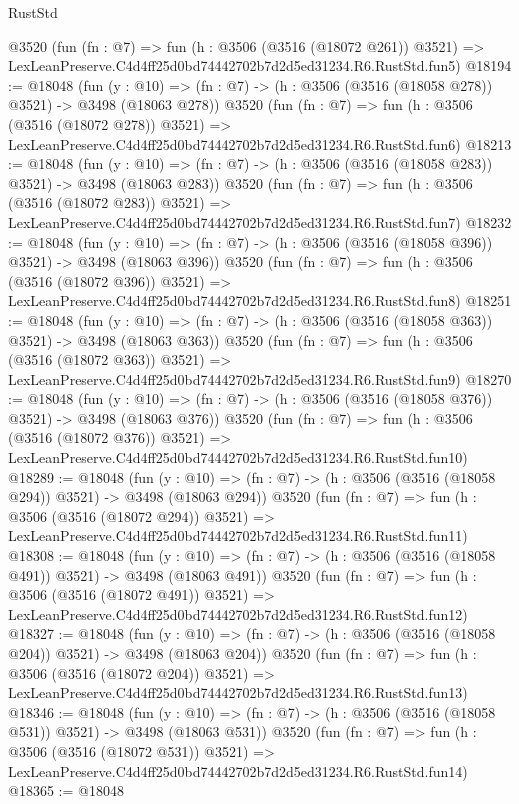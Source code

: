 \begin{lexlean}{RustStd}
\begin{coremodule}
    @3520
    (fun (fn : @7) =>
    fun (h : @3506 (@3516 (@18072 @261)) @3521) =>
    LexLeanPreserve.C4d4ff25d0bd74442702b7d2d5ed31234.R6.RustStd.fun5)
@18194 := @18048
    (fun (y : @10) => (fn : @7) -> (h : @3506 (@3516 (@18058 @278)) @3521) -> @3498 (@18063 @278))
    @3520
    (fun (fn : @7) =>
    fun (h : @3506 (@3516 (@18072 @278)) @3521) =>
    LexLeanPreserve.C4d4ff25d0bd74442702b7d2d5ed31234.R6.RustStd.fun6)
@18213 := @18048
    (fun (y : @10) => (fn : @7) -> (h : @3506 (@3516 (@18058 @283)) @3521) -> @3498 (@18063 @283))
    @3520
    (fun (fn : @7) =>
    fun (h : @3506 (@3516 (@18072 @283)) @3521) =>
    LexLeanPreserve.C4d4ff25d0bd74442702b7d2d5ed31234.R6.RustStd.fun7)
@18232 := @18048
    (fun (y : @10) => (fn : @7) -> (h : @3506 (@3516 (@18058 @396)) @3521) -> @3498 (@18063 @396))
    @3520
    (fun (fn : @7) =>
    fun (h : @3506 (@3516 (@18072 @396)) @3521) =>
    LexLeanPreserve.C4d4ff25d0bd74442702b7d2d5ed31234.R6.RustStd.fun8)
@18251 := @18048
    (fun (y : @10) => (fn : @7) -> (h : @3506 (@3516 (@18058 @363)) @3521) -> @3498 (@18063 @363))
    @3520
    (fun (fn : @7) =>
    fun (h : @3506 (@3516 (@18072 @363)) @3521) =>
    LexLeanPreserve.C4d4ff25d0bd74442702b7d2d5ed31234.R6.RustStd.fun9)
@18270 := @18048
    (fun (y : @10) => (fn : @7) -> (h : @3506 (@3516 (@18058 @376)) @3521) -> @3498 (@18063 @376))
    @3520
    (fun (fn : @7) =>
    fun (h : @3506 (@3516 (@18072 @376)) @3521) =>
    LexLeanPreserve.C4d4ff25d0bd74442702b7d2d5ed31234.R6.RustStd.fun10)
@18289 := @18048
    (fun (y : @10) => (fn : @7) -> (h : @3506 (@3516 (@18058 @294)) @3521) -> @3498 (@18063 @294))
    @3520
    (fun (fn : @7) =>
    fun (h : @3506 (@3516 (@18072 @294)) @3521) =>
    LexLeanPreserve.C4d4ff25d0bd74442702b7d2d5ed31234.R6.RustStd.fun11)
@18308 := @18048
    (fun (y : @10) => (fn : @7) -> (h : @3506 (@3516 (@18058 @491)) @3521) -> @3498 (@18063 @491))
    @3520
    (fun (fn : @7) =>
    fun (h : @3506 (@3516 (@18072 @491)) @3521) =>
    LexLeanPreserve.C4d4ff25d0bd74442702b7d2d5ed31234.R6.RustStd.fun12)
@18327 := @18048
    (fun (y : @10) => (fn : @7) -> (h : @3506 (@3516 (@18058 @204)) @3521) -> @3498 (@18063 @204))
    @3520
    (fun (fn : @7) =>
    fun (h : @3506 (@3516 (@18072 @204)) @3521) =>
    LexLeanPreserve.C4d4ff25d0bd74442702b7d2d5ed31234.R6.RustStd.fun13)
@18346 := @18048
    (fun (y : @10) => (fn : @7) -> (h : @3506 (@3516 (@18058 @531)) @3521) -> @3498 (@18063 @531))
    @3520
    (fun (fn : @7) =>
    fun (h : @3506 (@3516 (@18072 @531)) @3521) =>
    LexLeanPreserve.C4d4ff25d0bd74442702b7d2d5ed31234.R6.RustStd.fun14)
@18365 := @18048

\end{coremodule}
\end{lexlean}

